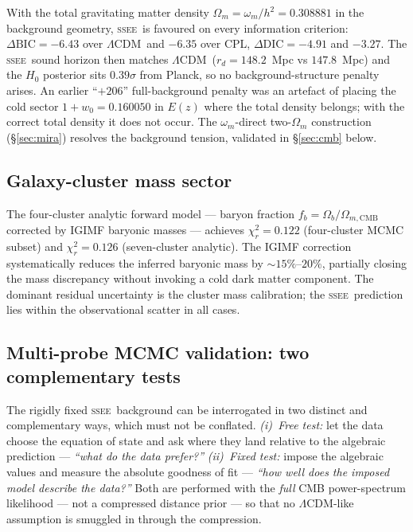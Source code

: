 \documentclass[12pt,a4paper]{article}
\newcommand{\SSEE}{\textsc{ssee}}
\newcommand{\LCDM}{$\Lambda$CDM}
\begin{document}
With the total gravitating matter density $\Omega_m=\omega_m/h^2=0.308881$ in the
background geometry, \SSEE\ is favoured on every information criterion:
$\Delta\mathrm{BIC}=-6.43$ over \LCDM\ and $-6.35$ over CPL, $\Delta\mathrm{DIC}=
-4.91$ and $-3.27$. The \SSEE\ sound horizon then matches \LCDM\
($r_d=148.2$~Mpc vs $147.8$~Mpc) and the $H_0$ posterior sits $0.39\sigma$ from
Planck, so no background-structure penalty arises. An earlier ``$+206$''
full-background penalty was an artefact of placing the cold sector
$1+w_0=0.160050$ in $E(z)$ where the total density belongs; with the correct total
density it does not occur.
The $\omega_m$-direct two-$\Omega_m$ construction (\S\ref{sec:mira}) resolves
the background tension, validated in \S\ref{sec:cmb} below.

\subsection{Galaxy-cluster mass sector}
\label{sec:clusters}

The four-cluster analytic forward model --- baryon fraction
$f_b = \Omega_b/\Omega_{m,\mathrm{CMB}}$ corrected by IGIMF
baryonic masses \citep{Zhang2026} --- achieves $\chi^2_r = 0.122$
(four-cluster MCMC subset) and $\chi^2_r = 0.126$ (seven-cluster analytic).
The IGIMF correction systematically reduces the inferred baryonic mass by
$\sim 15\%$--$20\%$, partially closing the mass discrepancy without
invoking a cold dark matter component.
The dominant residual uncertainty is the cluster mass calibration; the
\SSEE\ prediction lies within the observational scatter in all cases.

\subsection{Multi-probe MCMC validation: two complementary tests}
\label{sec:mcmc_fase4}

The rigidly fixed \SSEE\ background can be interrogated in two distinct and
complementary ways, which must not be conflated. \emph{(i)~Free test:} let the
data choose the equation of state and ask where they land relative to the
algebraic prediction --- \emph{``what do the data prefer?''} \emph{(ii)~Fixed
test:} impose the algebraic values and measure the absolute goodness of fit ---
\emph{``how well does the imposed model describe the data?''} Both are performed
with the \emph{full} CMB power-spectrum likelihood --- not a compressed distance
prior --- so that no \LCDM-like assumption is smuggled in through the
compression.
\end{document}
